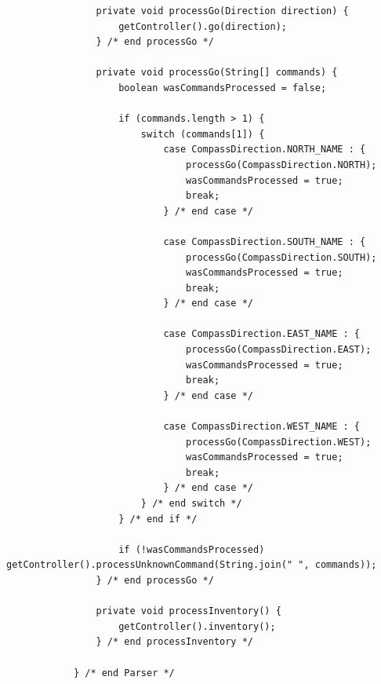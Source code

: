 \documentclass[a4paper, 11pt]{article}
\begin{document}
\begin{lstlisting}
                private void processGo(Direction direction) {
                    getController().go(direction);
                } /* end processGo */

                private void processGo(String[] commands) {
                    boolean wasCommandsProcessed = false;

                    if (commands.length > 1) {
                        switch (commands[1]) {
                            case CompassDirection.NORTH_NAME : {
                                processGo(CompassDirection.NORTH);
                                wasCommandsProcessed = true;
                                break;
                            } /* end case */

                            case CompassDirection.SOUTH_NAME : {
                                processGo(CompassDirection.SOUTH);
                                wasCommandsProcessed = true;
                                break;
                            } /* end case */

                            case CompassDirection.EAST_NAME : {
                                processGo(CompassDirection.EAST);
                                wasCommandsProcessed = true;
                                break;
                            } /* end case */

                            case CompassDirection.WEST_NAME : {
                                processGo(CompassDirection.WEST);
                                wasCommandsProcessed = true;
                                break;
                            } /* end case */
                        } /* end switch */
                    } /* end if */

                    if (!wasCommandsProcessed) getController().processUnknownCommand(String.join(" ", commands));
                } /* end processGo */

                private void processInventory() {
                    getController().inventory();
                } /* end processInventory */

            } /* end Parser */



            \end{lstlisting}

        \newpage
\end{document}
